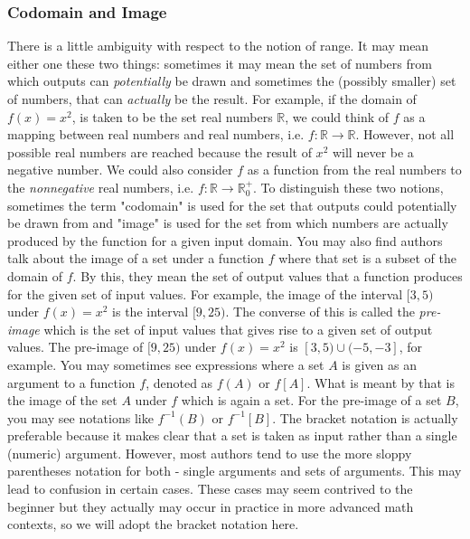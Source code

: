 \subsubsection{Codomain and Image}
There is a little ambiguity with respect to the notion of range. It may mean either one these two things: sometimes it may mean the set of numbers from which outputs can \emph{potentially} be drawn and sometimes the (possibly smaller) set of numbers, that can \emph{actually} be the result. For example, if the domain of $f(x) = x^2$, is taken to be the set real numbers $\mathbb{R}$, we could think of $f$ as a mapping between real numbers and real numbers, i.e. $f: \mathbb{R} \rightarrow \mathbb{R}$. However, not all possible real numbers are reached because the result of $x^2$ will never be a negative number. We could also consider $f$ as a function from the real numbers to the \emph{nonnegative} real numbers, i.e. $f: \mathbb{R} \rightarrow \mathbb{R}^+_0$. To distinguish these two notions, sometimes the term "codomain" is used for the set that outputs could potentially be drawn from and "image" is used for the set from which numbers are actually produced by the function for a given input domain. You may also find authors talk about the image of a set under a function $f$ where that set is a subset of the domain of $f$. By this, they mean the set of output values that a function produces for the given set of input values. For example, the image of the interval $[3,5)$ under $f(x) = x^2$ is the interval $[9,25)$. The converse of this is called the \emph{pre-image} which is the set of input values that gives rise to a given set of output values. The pre-image of $[9,25)$ under $f(x) = x^2$ is $[3,5) \cup (-5,-3]$, for example. You may sometimes see expressions where a set $A$ is given as an argument to a function $f$, denoted as $f(A)$ or $f[A]$. What is meant by that is the image of the set $A$ under $f$ which is again a set. For the pre-image of a set $B$, you may see notations like $f^{-1}(B)$ or  $f^{-1}[B]$. The bracket notation is actually preferable because it makes clear that a set is taken as input rather than a single (numeric) argument. However, most authors tend to use the more sloppy parentheses notation for both - single arguments and sets of arguments. This may lead to confusion in certain cases. These cases may seem contrived to the beginner but they actually may occur in practice in more advanced math contexts, so we will adopt the bracket notation here.



